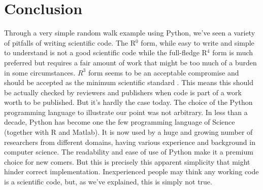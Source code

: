 \documentclass[a4paper,11pt]{article}
\begin{document}
\section*{Conclusion}

Through a very simple random walk example using Python, we've seen a variety of pitfalls of writing scientific code. The R$^0$ form, while easy to write and simple to understand is not a good scientific code while the full-fledge R$^{4}$ form is much preferred but requires a fair amount of work that might be too much of a burden in some circumstances. $R^3$ form seems to be an acceptable compromise and should be accepted as the minimum scientific standard \citep{Wilson:2017}. This means this should be actually checked by reviewers and publishers when code is part of a work worth to be published. But it's hardly the case today.
%
The choice of the Python programming language to illustrate our point was not arbitrary. In less than a decade, Python has become one the few programming language of Science (together with R and Matlab). It is now used by a huge and growing number of researchers from different domains, having various experience and background in computer science. The readability and ease of use of Python make it a premium choice for new comers. But this is precisely this apparent simplicity that might hinder correct implementation. Inexperienced people may think any working code is a scientific code, but, as we've explained, this is simply not true.




\renewcommand*{\bibfont}{\small}
\printbibliography[title=References]


\end{document}
